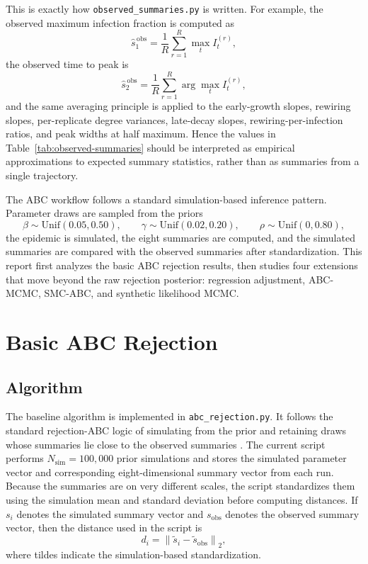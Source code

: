 \documentclass[11pt]{article}
\begin{document}
This is exactly how \texttt{observed\_summaries.py} is written. For example, the observed maximum infection fraction is computed as
\[
\widehat{s}^{\,\mathrm{obs}}_1
= \frac{1}{R}\sum_{r=1}^{R} \max_t I_t^{(r)},
\]
the observed time to peak is
\[
\widehat{s}^{\,\mathrm{obs}}_2
= \frac{1}{R}\sum_{r=1}^{R} \arg\max_t I_t^{(r)},
\]
and the same averaging principle is applied to the early-growth slopes, rewiring slopes, per-replicate degree variances, late-decay slopes, rewiring-per-infection ratios, and peak widths at half maximum. Hence the values in Table~\ref{tab:observed-summaries} should be interpreted as empirical approximations to expected summary statistics, rather than as summaries from a single trajectory.

The ABC workflow follows a standard simulation-based inference pattern. Parameter draws are sampled from the priors
\[
\beta \sim \mathrm{Unif}(0.05,0.50), \qquad
\gamma \sim \mathrm{Unif}(0.02,0.20), \qquad
\rho \sim \mathrm{Unif}(0,0.80),
\]
the epidemic is simulated, the eight summaries are computed, and the simulated summaries are compared with the observed summaries after standardization. This report first analyzes the basic ABC rejection results, then studies four extensions that move beyond the raw rejection posterior: regression adjustment, ABC-MCMC, SMC-ABC, and synthetic likelihood MCMC.
\section{Basic ABC Rejection}

\subsection{Algorithm}

The baseline algorithm is implemented in \texttt{abc\_rejection.py}. It follows the standard rejection-ABC logic of simulating from the prior and retaining draws whose summaries lie close to the observed summaries \citep{beaumont2002}. The current script performs $N_{\text{sim}}=100{,}000$ prior simulations and stores the simulated parameter vector and corresponding eight-dimensional summary vector from each run. Because the summaries are on very different scales, the script standardizes them using the simulation mean and standard deviation before computing distances. If $s_i$ denotes the simulated summary vector and $s_{\text{obs}}$ denotes the observed summary vector, then the distance used in the script is
\[
d_i = \left\lVert \tilde{s}_i - \tilde{s}_{\text{obs}} \right\rVert_2,
\]
where tildes indicate the simulation-based standardization.
\end{document}
